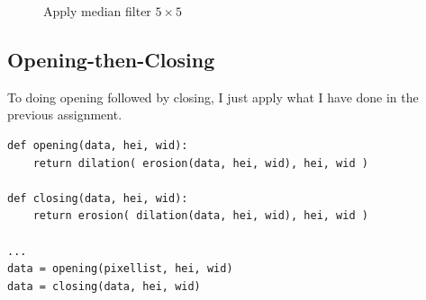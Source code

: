 \documentclass[14pt,a4paper]{extarticle}
\begin{document}
\begin{figure}[H]
\centering
	\hfill
\caption{Apply median filter $5 \times 5$}
\end{figure}

\subsection{Opening-then-Closing}

To doing opening followed by closing, I just apply what I have done in the previous assignment.
\begin{lstlisting}
def opening(data, hei, wid):
	return dilation( erosion(data, hei, wid), hei, wid )

def closing(data, hei, wid):
	return erosion( dilation(data, hei, wid), hei, wid )

...
data = opening(pixellist, hei, wid)
data = closing(data, hei, wid)
\end{lstlisting}
\end{document}
